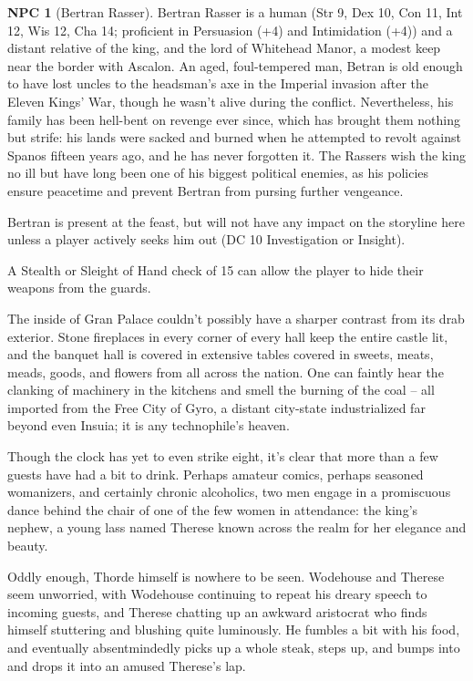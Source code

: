 \documentclass{report}
\theoremstyle{definition}
\newtheorem{npc}{NPC}[chapter]
\begin{document}
\begin{npc}[Bertran Rasser]
Bertran Rasser is a human (Str 9, Dex 10, Con 11, Int 12, Wis 12, Cha 14; proficient in Persuasion (+4) and Intimidation (+4)) and a distant relative of the king, and the lord of Whitehead Manor, a modest keep near the border with Ascalon. An aged, foul-tempered man, Betran is old enough to have lost uncles to the headsman's axe in the Imperial invasion after the Eleven Kings' War, though he wasn't alive during the conflict. Nevertheless, his family has been hell-bent on revenge ever since, which has brought them nothing but strife: his lands were sacked and burned when he attempted to revolt against Spanos fifteen years ago, and he has never forgotten it. The Rassers wish the king no ill but have long been one of his biggest political enemies, as his policies ensure peacetime and prevent Bertran from pursing further vengeance.

Bertran is present at the feast, but will not have any impact on the storyline here unless a player actively seeks him out (DC 10 Investigation or Insight).
\end{npc}
A Stealth or Sleight of Hand check of 15 can allow the player to hide their weapons from the guards.
\begin{displayquote}
The inside of Gran Palace couldn't possibly have a sharper contrast from its drab exterior. Stone fireplaces in every corner of every hall keep the entire castle lit, and the banquet hall is covered in extensive tables covered in sweets, meats, meads, goods, and flowers from all across the nation. One can faintly hear the clanking of machinery in the kitchens and smell the burning of the coal – all imported from the Free City of Gyro, a distant city-state industrialized far beyond even Insuia; it is any technophile's heaven.

Though the clock has yet to even strike eight, it's clear that more than a few guests have had a bit to drink. Perhaps amateur comics, perhaps seasoned womanizers, and certainly chronic alcoholics, two men engage in a promiscuous dance behind the chair of one of the few women in attendance: the king's nephew, a young lass named Therese known across the realm for her elegance and beauty.

Oddly enough, Thorde himself is nowhere to be seen. Wodehouse and Therese seem unworried, with Wodehouse continuing to repeat his dreary speech to incoming guests, and Therese chatting up an awkward aristocrat who finds himself stuttering and blushing quite luminously. He fumbles a bit with his food, and eventually absentmindedly picks up a whole steak, steps up, and bumps into and drops it into an amused Therese's lap.
\end{displayquote}
\end{document}

